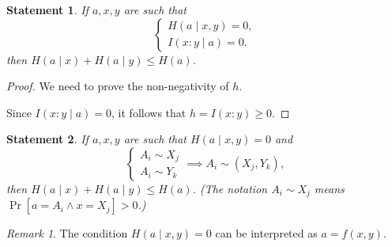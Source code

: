 \documentclass[12pt,sans]{article}
\theoremstyle{definition}
\theoremstyle{plain}
\newtheorem{statement}{Statement}[section]
\theoremstyle{remark}
\newtheorem{remark}{Remark}[section]
\begin{document}
\begin{statement}
    If \(a, x, y\) are such that
\[
    \begin{cases}
        H(a \mid x, y) = 0,\\
        I(x : y \mid a) = 0.
    \end{cases}
\]
then \(H(a \mid x) + H(a \mid y) \le H(a)\).
\end{statement}
\begin{proof}
    We need to prove the non-negativity of \(h\).
    \begin{center}
    \end{center}
Since \(I(x : y \mid a) = 0\), it follows that \(h = I(x : y) \ge 0\).
\end{proof}
\begin{statement}\label{st:entropy:triple-rect}
    If \(a, x, y\) are such that \(H(a \mid x, y) = 0\) and
\[
    \begin{cases}
        A_i \sim X_j\\
        A_i \sim Y_k
    \end{cases} \implies A_i \sim (X_j, Y_k),
\]
then \(H(a \mid x) + H(a \mid y) \le H(a)\). (The notation \(A_i \sim X_j\) means \(\Pr[a = A_i \land x = X_j] > 0\).)
\end{statement}
\begin{remark}
    The condition \(H(a \mid x, y) = 0\) can be interpreted as \(a = f(x, y)\).
\end{remark}
\end{document}
